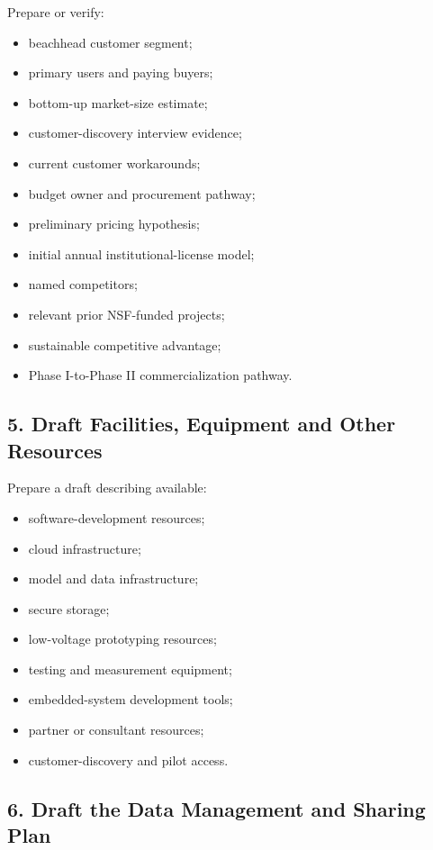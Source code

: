 \documentclass[11pt,letterpaper]{article}
\begin{document}
Prepare or verify:

\begin{itemize}[leftmargin=0.25in]
    \item beachhead customer segment;
    \item primary users and paying buyers;
    \item bottom-up market-size estimate;
    \item customer-discovery interview evidence;
    \item current customer workarounds;
    \item budget owner and procurement pathway;
    \item preliminary pricing hypothesis;
    \item initial annual institutional-license model;
    \item named competitors;
    \item relevant prior NSF-funded projects;
    \item sustainable competitive advantage;
    \item Phase I-to-Phase II commercialization pathway.
\end{itemize}

\subsection{5. Draft Facilities, Equipment and Other Resources}

Prepare a draft describing available:

\begin{itemize}[leftmargin=0.25in]
    \item software-development resources;
    \item cloud infrastructure;
    \item model and data infrastructure;
    \item secure storage;
    \item low-voltage prototyping resources;
    \item testing and measurement equipment;
    \item embedded-system development tools;
    \item partner or consultant resources;
    \item customer-discovery and pilot access.
\end{itemize}

\subsection{6. Draft the Data Management and Sharing Plan}
\end{document}
